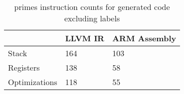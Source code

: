 \begin{table}[h!]
\centering
\begin{tabular}{p{}p{}p{}}
  \hline
 & LLVM IR & ARM Assembly \\ 
  \hline
Stack & 164 & 103 \\ 
  Registers & 138 &  58 \\ 
  Optimizations & 118 &  55 \\ 
   \hline
\end{tabular}
\caption{primes instruction counts for generated code excluding labels}
\end{table}

